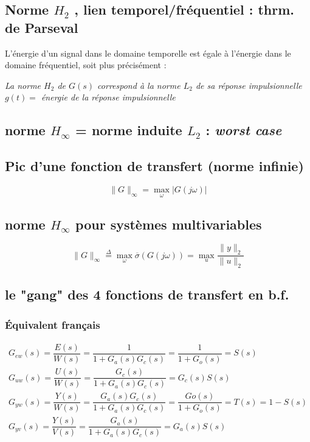 \documentclass[document.tex]{subfiles}
\begin{document}
\subsection{Norme $H_2$ , lien temporel/fréquentiel : thrm. de Parseval}

L'énergie d'un signal dans le domaine temporelle est égale à l'énergie dans le domaine fréquentiel, soit plus précisément :

\begin{center}
\textit{La norme $H_2$ de $G(s)$ correspond à la norme $L_2$ de sa réponse impulsionnelle $g(t) =$ énergie de la réponse impulsionnelle}
\end{center}

\subsection{norme $H_\infty$ = norme induite $L_2$ : \textit{worst case}}

\subsection{Pic d'une fonction de transfert (norme infinie)}

$$ \boxed{\parallel G \parallel_\infty = \max_{\omega} \vert G(j\omega) \vert }$$


\subsection{norme $H_\infty$ pour systèmes multivariables}

$$
\boxed{\parallel G \parallel_\infty \overset{\Delta}{=} \max_\omega \overline{\sigma}(G(j\omega)) = \max_u \dfrac{\parallel y \parallel_2}{\parallel u \parallel_2}}
$$


\subsection{le "gang" des 4 fonctions de transfert en b.f.}


\subsubsection{Équivalent français}

$$
\begin{array}{l}
G_{ew}(s) = \dfrac{E(s)}{W(s)} = \dfrac{1}{1 + G_a(s)G_c(s)} = \dfrac{1}{1+G_o(s)} = S(s) \\[12pt]
G_{uw}(s) = \dfrac{U(s)}{W(s)} = \dfrac{G_c(s)}{1 + G_a(s)G_c(s)} =  G_c(s) S(s)\\[12pt]
G_{yw}(s) = \dfrac{Y(s)}{W(s)} = \dfrac{G_a(s)G_c(s)}{1 + G_a(s)G_c(s)} = \dfrac{Go(s)}{1+G_o(s)} = T(s) = 1-S(s) \\[12pt]
G_{yv}(s) = \dfrac{Y(s)}{V(s)} = \dfrac{G_a(s)}{1 + G_a(s)G_c(s)} = G_a(s) S(s) \\[12pt]
\end{array}
$$
\end{document}
